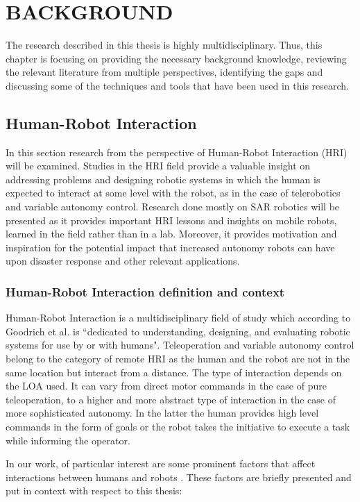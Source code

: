 \documentclass[a4paper,12pt,oneside,openright]{bhamthesis}
\begin{document}
\chapter{BACKGROUND}\label{chapter:background}

The research described in this thesis is highly multidisciplinary. Thus, this chapter is focusing on providing the necessary background knowledge, reviewing the relevant literature from multiple perspectives, identifying the gaps and discussing some of the techniques and tools that have been used in this research.


\section{Human-Robot Interaction}
In this section research from the perspective of Human-Robot Interaction (HRI) will be examined. Studies in the HRI field provide a valuable insight on addressing problems and designing robotic systems in which the human is expected to interact at some level with the robot, as in the case of telerobotics and variable autonomy control. Research done mostly on SAR robotics will be presented as it provides important HRI lessons and insights on mobile robots, learned in the field rather than in a lab. Moreover, it provides motivation and inspiration for the potential impact that increased autonomy robots can have upon disaster response and other relevant applications.

\subsection{Human-Robot Interaction definition and context}
Human-Robot Interaction is a multidisciplinary field of study which according to Goodrich et al. \cite{Goodrich2007a} is ``dedicated to understanding, designing, and evaluating robotic systems for use by or with humans". Teleoperation and variable autonomy control belong to the category of remote HRI as the human and the robot are not in the same location but interact from a distance. The type of interaction depends on the LOA used. It can vary from direct motor commands in the case of pure teleoperation, to a higher and more abstract type of interaction in the case of more sophisticated autonomy. In the latter the human provides high level commands in the form of goals or the robot takes the initiative to execute a task while informing the operator.

In our work, of particular interest are some prominent factors that affect interactions between humans and robots \cite{Goodrich2007a}. These factors are briefly presented and put in context with respect to this thesis:
\end{document}
